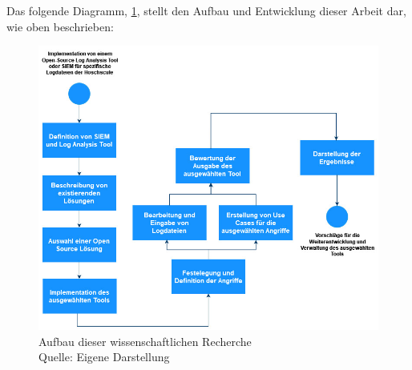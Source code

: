 

\newpage
Das folgende Diagramm, \ref{fig:AblaufderArbeit}, stellt den Aufbau und Entwicklung dieser Arbeit dar, wie oben beschrieben:

\begin{figure}[H]
   \centering
   \includegraphics[width=1\textwidth]{assets/1_p1.jpg}
   \caption[Aufbau dieser wissenschaftlichen Recherche]
   {Aufbau dieser wissenschaftlichen Recherche \\Quelle: Eigene Darstellung }
   \label{fig:AblaufderArbeit}
   \centering
\end{figure}



